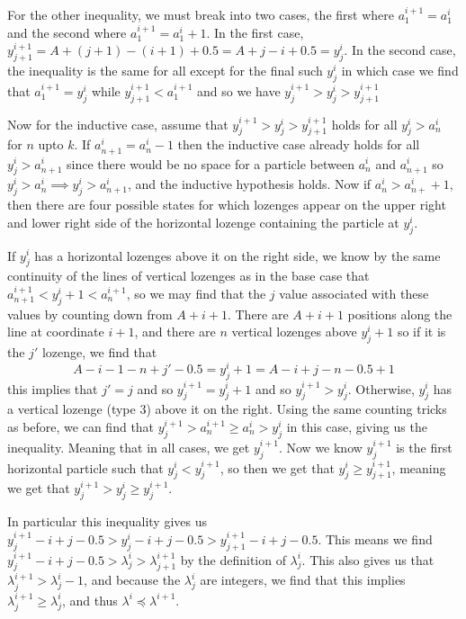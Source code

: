 \documentclass[12pt]{article}
\begin{document}
	For the other inequality, we must break into two cases, the first where $a_1^{i+1}=a_1^i$ and the second where $a_1^{i+1}=a_1^i+1$. 
	In the first case, $y_{j+1}^{i+1}=A+(j+1)-(i+1)+0.5=A+j-i+0.5=y_j^i$. 
	In the second case, the inequality is the same for all except for the final such $y_j^i$ in which case we find that $a_1^{i+1}=y_j^i$ while $y_{j+1}^{i+1}<a_1^{i+1}$ and so we have $y_j^{i+1}>y_j^i>y_{j+1}^{i+1}$
	
	Now for the inductive case, assume that $y_j^{i+1}>y_j^{i}>y_{j+1}^{i+1}$ holds for all $y_j^i>a_n^i$ for $n$ upto $k$. 
	If $a_{n+1}^{i}=a_n^i-1$ then the inductive case already holds for all $y_j^i>a_{n+1}^i$ since there would be no space for a particle between $a_n^i$ and $a_{n+1}^i$ so $y_j^i>a_n^i\implies y_j^i>a_{n+1}^i$, and the inductive hypothesis holds. 
	Now if $a_n^i>a_{n+}^i+1$, then there are four possible states for which lozenges appear on the upper right and lower right side of the horizontal lozenge containing the particle at $y_j^i$. 
	
	If $y_j^i$ has a horizontal lozenges above it on the right side, we know by the same continuity of the lines of vertical lozenges as in the base case that $a_{n+1}^{i+1}< y_{j}^{i}+1<a_n^{i+1}$, so we may find that the $j$ value associated with these values by counting down from $A+i+1$. 
	There are $A+i+1$ positions along the line at coordinate $i+1$, and there are $n$ vertical lozenges above $y_j^i+1$ so if it is the $j'$ lozenge, we find that $$A-i-1-n+j'-0.5=y_j^i+1=A-i+j-n-0.5+1$$  
	this implies that $j'= j$ and so $y^{i+1}_{j}=y^{i}_j+1$ and so $y_{j}^{i+1}>y^i_j$. 
	Otherwise, $y_j^i$ has a vertical lozenge (type 3) above it on the right.
	Using the same counting tricks as before, we can find that $y_{j}^{i+1}>a_{n}^{i+1}\geq a_n^i>y_j^i$ in this case, giving us the inequality. Meaning that in all cases, we get $y_{j}^{i+1}$.  
	Now we  know $y_{j}^{i+1}$ is the first horizontal particle such that $y_j^i<y_j^{i+1}$, so then we get that $y_j^i\geq y_{j+1}^{i+1}$, meaning we get that $y_j^{i+1}>y_j^i\geq y_j^{i+1}$. 
	
	In particular this inequality gives us $y_j^{i+1}-i+j-0.5>y_j^i-i+j-0.5>y^{i+1}_{j+1}-i+j-0.5$. 
	This means we find $y_j^{i+1}-i+j-0.5>\lambda_j^i>\lambda_{j+1}^{i+1}$ by the definition of $\lambda_j^i$.
	This also gives us that $\lambda_j^{i+1}>\lambda_j^i-1$, and because the $\lambda_j^i$ are integers, we find that this implies $\lambda_j^{i+1}\geq\lambda_j^i$, and thus $\lambda^i\preceq \lambda^{i+1}$.
	
\end{document}
